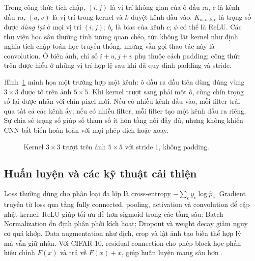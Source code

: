 \documentclass[12pt,a4paper]{report}
\begin{document}
Trong công thức tích chập, $(i,j)$ là vị trí không gian của ô đầu ra, $c$ là kênh đầu ra, $(u,v)$ là vị trí trong kernel và $k$ duyệt kênh đầu vào. $K_{u,v,k,c}$ là trọng số được \emph{dùng lại} ở mọi vị trí $(i,j)$; $b_c$ là bias của kênh $c$; $\phi$ có thể là ReLU. Các thư viện học sâu thường tính tương quan chéo, tức không lật kernel như định nghĩa tích chập toán học truyền thống, nhưng vẫn gọi thao tác này là convolution. Ở biên ảnh, chỉ số $i+u,j+v$ phụ thuộc cách padding; công thức trên được hiểu ở những vị trí hợp lệ sau khi đã quy định padding và stride.

Hình~\ref{fig:essay03-convolution} minh họa một trường hợp một kênh: ô đầu ra đầu tiên dùng đúng vùng $3\times3$ được tô trên ảnh $5\times5$. Khi kernel trượt sang phải một ô, cùng chín trọng số lại được nhân với chín pixel mới. Nếu có nhiều kênh đầu vào, mỗi filter trải qua tất cả các kênh ấy; nếu có nhiều filter, mỗi filter tạo một kênh đầu ra riêng. Sự chia sẻ trọng số giúp số tham số ít hơn tầng nối đầy đủ, nhưng không khiến CNN bất biến hoàn toàn với mọi phép dịch hoặc xoay.
\begin{figure}[htbp]\centering
{}
\caption{Kernel $3\times3$ trượt trên ảnh $5\times5$ với stride 1, không padding.}\label{fig:essay03-convolution}
\end{figure}

\subsection{Huấn luyện và các kỹ thuật cải thiện}
Loss thường dùng cho phân loại đa lớp là cross-entropy $-\sum_c y_c\log\hat p_c$. Gradient truyền từ loss qua tầng fully connected, pooling, activation và convolution để cập nhật kernel. ReLU giúp tối ưu dễ hơn sigmoid trong các tầng sâu; Batch Normalization ổn định phân phối kích hoạt; Dropout và weight decay giảm nguy cơ quá khớp. Data augmentation như dịch, crop và lật ảnh tạo biến thể hợp lý mà vẫn giữ nhãn. Với CIFAR-10, residual connection cho phép block học phần hiệu chỉnh $F(x)$ và trả về $F(x)+x$, giúp huấn luyện mạng sâu hơn \cite{resnet2016}.
\end{document}
